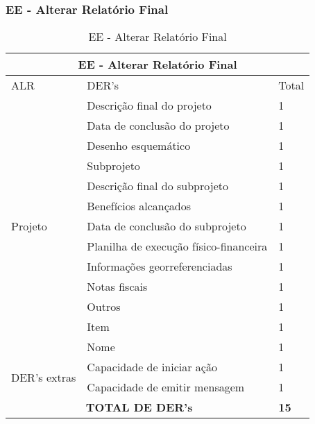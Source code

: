 \vfill
\pagebreak

  \subsubsection{EE - Alterar Relatório Final}
  \begin{table}[!h]
\centering
\caption{EE - Alterar Relatório Final}
\label{ee_alterar_relatorio_final}
\begin{tabular}{|l|l|l|}
\hline
\multicolumn{3}{|c|}{EE - Alterar Relatório Final}                                                                 \\ \hline
ALR                           & DER's                                                & Total              \\ \hline
\multirow{13}{*}{Projeto}     & Descrição final do projeto             & 1 \\ \cline{2-3}
                             & Data de conclusão do projeto           & 1 \\ \cline{2-3}
                             & Desenho esquemático                    & 1 \\ \cline{2-3} 
			      & Subprojeto                             & 1 \\ \cline{2-3}
                             & Descrição final do subprojeto          & 1 \\ \cline{2-3}
                             & Benefícios alcançados                  & 1 \\ \cline{2-3}
                             & Data de conclusão do subprojeto        & 1 \\ \cline{2-3}
                             & Planilha de execução físico-financeira & 1 \\ \cline{2-3}
                             & Informações georreferenciadas          & 1 \\ \cline{2-3}
                             & Notas fiscais                          & 1 \\ \cline{2-3}
                             & Outros                                 & 1 \\ \cline{2-3}
                             & Item                                   & 1 \\ \cline{2-3}
                             & Nome                                   & 1 \\ \cline{2-3} \hline
\multirow{2}{*}{DER's extras} & Capacidade de iniciar ação             & 1 \\ \cline{2-3}
                 & Capacidade de emitir mensagem& 1 \\ \hline
\multicolumn{2}{|c|}{\textbf{TOTAL DE DER's}}                                                 & \textbf{15}                 \\ \hline
\end{tabular}
\end{table}


